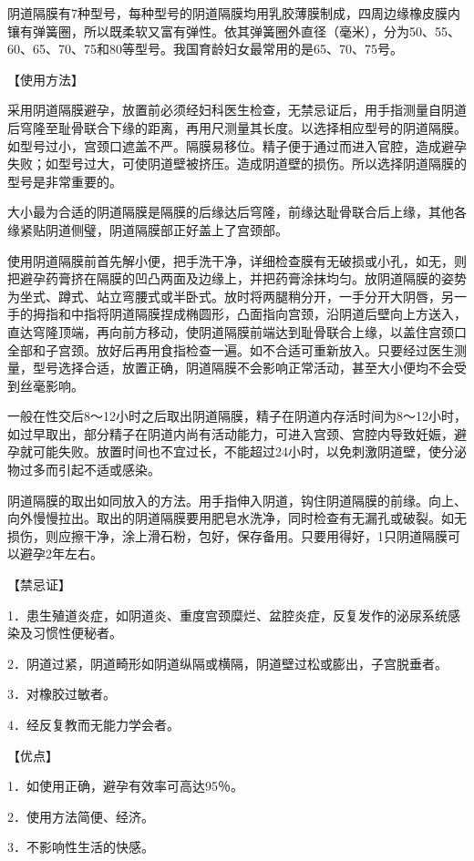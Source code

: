 \documentclass[12pt,UTF8]{ctexbook}
\begin{document}
阴道隔膜有7种型号，每种型号的阴道隔膜均用乳胶薄膜制成，四周边缘橡皮膜内镶有弹簧圈，所以既柔软又富有弹性。依其弹簧圈外直径（毫米），分为50、55、60、65、70、75和80等型号。我国育龄妇女最常用的是65、70、75号。

【使用方法】

采用阴道隔膜避孕，放置前必须经妇科医生检查，无禁忌证后，用手指测量自阴道后穹隆至耻骨联合下缘的距离，再用尺测量其长度。以选择相应型号的阴道隔膜。如型号过小，宫颈口遮盖不严。隔膜易移位。精子便于通过而进入官腔，造成避孕失败；如型号过大，可使阴道壁被挤压。造成阴道壁的损伤。所以选择阴道隔膜的型号是非常重要的。

大小最为合适的阴道隔膜是隔膜的后缘达后穹隆，前缘达耻骨联合后上缘，其他各缘紧贴阴道侧璧，阴道隔膜部正好盖上了宫颈部。

使用阴道隔膜前首先解小便，把手洗干净，详细检查膜有无破损或小孔，如无，则把避孕药膏挤在隔膜的凹凸两面及边缘上，并把药膏涂抹均匀。放阴道隔膜的姿势为坐式、蹲式、站立弯腰式或半卧式。放时将两腿稍分开，一手分开大阴唇，另一手的拇指和中指将阴道隔膜捏成椭圆形，凸面指向宫颈，沿阴道后壁向上方送入，直达穹隆顶端，再向前方移动，使阴道隔膜前端达到耻骨联合上缘，以盖住宫颈口全部和子宫颈。放好后再用食指检查一遍。如不合适可重新放入。只要经过医生测量，型号选择合适，放置正确，阴道隔膜不会影响正常活动，甚至大小便均不会受到丝毫影响。

一般在性交后8～12小时之后取出阴道隔膜，精子在阴道内存活时间为8～12小时，如过早取出，部分精子在阴道内尚有活动能力，可进入宫颈、宫腔内导致妊娠，避孕就可能失败。放置时间也不宜过长，不能超过24小时，以免刺激阴道壁，使分泌物过多而引起不适或感染。

阴道隔膜的取出如同放入的方法。用手指伸入阴道，钩住阴道隔膜的前缘。向上、向外慢慢拉出。取出的阴道隔膜要用肥皂水洗净，同时检查有无漏孔或破裂。如无损伤，则应擦干净，涂上滑石粉，包好，保存备用。只要用得好，1只阴道隔膜可以避孕2年左右。

【禁忌证】

1．患生殖道炎症，如阴道炎、重度宫颈糜烂、盆腔炎症，反复发作的泌尿系统感染及习惯性便秘者。

2．阴道过紧，阴道畸形如阴道纵隔或横隔，阴道壁过松或膨出，子宫脱垂者。

3．对橡胶过敏者。

4．经反复教而无能力学会者。

【优点】

1．如使用正确，避孕有效率可高达95％。

2．使用方法简便、经济。

3．不影响性生活的快感。
\end{document}
